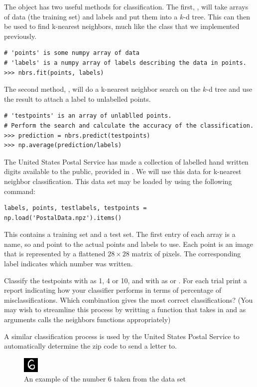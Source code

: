 The  object has two useful methods for classification.
The first, , will take arrays of data (the training set) and labels and put them into a $k$-d tree.
This can then be used to find k-nearest neighbors, much like the  class that we implemented previously.

\begin{lstlisting}
# 'points' is some numpy array of data
# 'labels' is a numpy array of labels describing the data in points.
>>> nbrs.fit(points, labels)
\end{lstlisting}

The second method, , will do a k-nearest neighbor search on the $k$-d tree and use the result to attach a label to unlabelled points.

\begin{lstlisting}
# 'testpoints' is an array of unlablled points.
# Perform the search and calculate the accuracy of the classification.
>>> prediction = nbrs.predict(testpoints)
>>> np.average(prediction/labels)
\end{lstlisting}

\begin{problem}
The United States Postal Service has made a collection of labelled hand written digits available to the public, provided in .
We will use this data for k-nearest neighbor classification.
This data set may be loaded by using the following command:
\begin{lstlisting}
labels, points, testlabels, testpoints = np.load('PostalData.npz').items()
\end{lstlisting}
This contains a training set and a test set.
The first entry of each array is a name, so  and  point to the actual points and labels to use.
Each point is an image that is represented by a flattened $28 \times 28$ matrix of pixels. 
The corresponding label indicates which number was written.

Classify the testpoints with  as 1, 4 or 10, and with  as  or .
For each trial print a report indicating how your classifier performs in terms of percentage of misclassifications.
Which combination gives the most correct classifications?
(You may wish to streamline this process by writting a function that takes in  and  as arguments calls the neighbors functions appropriately)

A similar classification process is used by the United States Postal Service to automatically determine the zip code to send a letter to.

\begin{figure}[H]
\includegraphics[width=.25\textwidth]{Example.png}
\caption{An example of the number 6 taken from the data set}
\end{figure}
\end{problem}